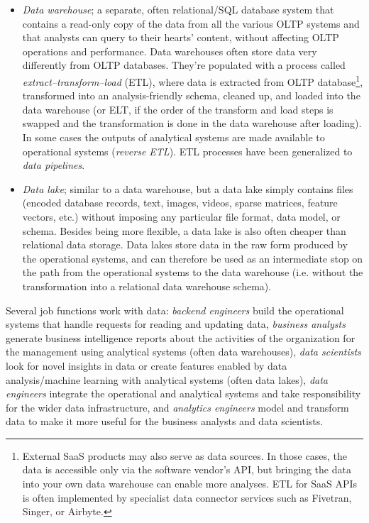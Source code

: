 \documentclass[table, xcdraw]{article}%
\begin{document}
\begin{itemize}
\begin{itemize}
        \item \textit{Data warehouse}; a separate, often relational/SQL database system that contains a read-only copy of the data from all the various OLTP systems and that analysts can query to their hearts’ content, without affecting OLTP operations and performance. Data warehouses often store data very differently from OLTP databases. They're populated with a process called \textit{extract–transform–load} (ETL), where data is extracted from OLTP database\footnote{External SaaS products may also serve as data sources. In those cases, the data is accessible only via the software vendor’s API, but bringing the data into your own data warehouse can enable more analyses. ETL for SaaS APIs is often implemented by specialist data connector services such as Fivetran, Singer, or Airbyte.}, transformed into an analysis-friendly schema, cleaned up, and loaded into the data warehouse (or ELT, if the order of the transform and load steps is swapped and the transformation is done in the data warehouse after loading). In some cases the outputs of analytical systems are made available to operational systems (\textit{reverse ETL}). ETL processes have been generalized to \textit{data pipelines}.
        \item \textit{Data lake}; similar to a data warehouse, but a data lake simply contains files (encoded database records, text, images, videos, sparse matrices, feature vectors, etc.) without imposing any particular file format, data model, or schema. Besides being more flexible, a data lake is also often cheaper than relational data storage. Data lakes store data in the raw form produced by the operational systems, and can therefore be used as an intermediate stop on the path from the operational systems to the data warehouse (i.e. without the transformation into a relational data warehouse schema).
    \end{itemize}
\end{itemize}
    
Several job functions work with data: \textit{backend engineers} build the operational systems that handle requests for reading and updating data, \textit{business analysts} generate business intelligence reports about the activities of the organization for the management using analytical systems (often data warehouses), \textit{data scientists} look for novel insights in data or create features enabled by data analysis/machine learning with analytical systems (often data lakes), \textit{data engineers} integrate the operational and analytical systems and take responsibility for the wider data infrastructure, and \textit{analytics engineers} model and transform data to make it more useful for the business analysts and data scientists.
\end{document}
